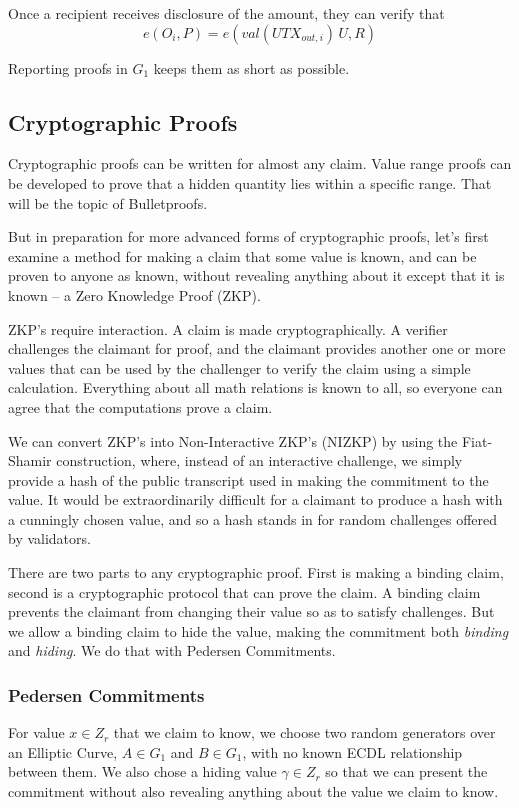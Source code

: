 \documentclass{yellowpaper}
\begin{document}
Once a recipient receives disclosure of the amount, they can verify that
$$e(O_i,P) = e(val(UTX_{out,i})\, U, R)$$

Reporting proofs in $G_1$ keeps them as short as possible.

\subsection{Cryptographic Proofs}
Cryptographic proofs can be written for almost any claim. Value range proofs can be developed to prove that a hidden quantity lies within a specific range. That will be the topic of Bulletproofs. 

But in preparation for more advanced forms of cryptographic proofs, let's first examine a method for making a claim that some value is known, and can be proven to anyone as known, without  revealing anything about it except that it is known -- a Zero Knowledge Proof (ZKP).

ZKP's require interaction. A claim is made cryptographically. A verifier challenges the claimant for proof, and the claimant provides another one or more values that can be used by the challenger to verify the claim using a simple calculation. Everything about all math relations is known to all, so everyone can agree that the computations prove a claim.

We can convert ZKP's  into Non-Interactive ZKP's (NIZKP)
 by using the Fiat-Shamir construction, where, instead of an interactive challenge, we simply provide a hash of the public transcript used in making the commitment to the value. It would be extraordinarily difficult for a claimant to produce a hash with a cunningly chosen value, and so a hash stands in for random challenges offered by validators.

There are two parts to any cryptographic proof. First is making a binding claim, second is a cryptographic protocol that can prove the claim. A binding claim prevents the claimant from changing their value so as to satisfy challenges. But we allow a binding claim to hide the value, making the commitment both {\em{binding}} and {\em{hiding}}. We do that with Pedersen Commitments. 

\subsubsection{Pedersen Commitments}
For value $x \in Z_r$ that we claim to know, we choose two random generators over an Elliptic Curve, $A \in G_1$ and $B \in G_1$, with no known ECDL relationship between them. We also chose a hiding value $\gamma \in Z_r$ so that we can present the commitment without also revealing anything about the value we claim to know.
 
\end{document}
